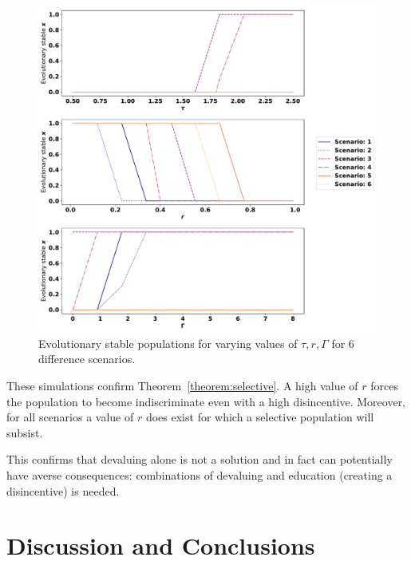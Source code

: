 \documentclass[10pt]{article}
\begin{document}
\begin{itemize}
    
\end{itemize}

\begin{figure}[!htbp]
    \includegraphics[width=\textwidth]{images/steady_populations.pdf}
    \caption{Evolutionary stable populations for varying values of \(\tau, r,
    \Gamma\) for 6 difference scenarios.}
    \label{fig:convergence-over-r}
\end{figure}

These simulations confirm Theorem~\ref{theorem:selective}. A high value of \(r\)
forces the population to become indiscriminate even with a high disincentive.
Moreover, for all scenarios a value of \(r\) does exist for which a selective
population will subsist.

This confirms that devaluing alone is not a solution and in fact can
potentially have averse consequences: combinations of devaluing and
education (creating a disincentive) is needed.

\section{Discussion and Conclusions}
\label{section:discussion}

\end{document}
